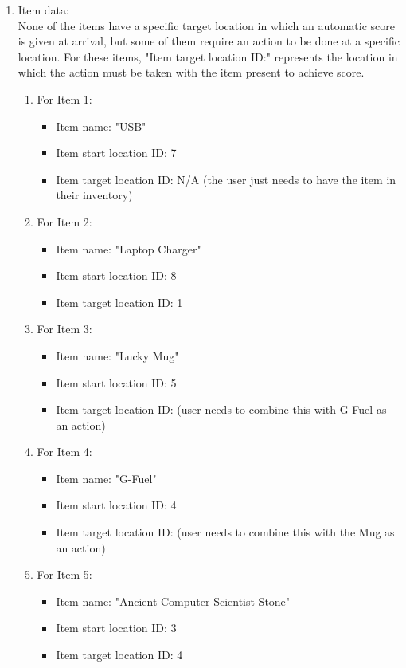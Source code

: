 \documentclass[11pt]{article}
\begin{document}
\begin{enumerate}
\item Item data:\\
None of the items have a specific target location in which an automatic score is given at arrival, but some of them require an action to be done at a specific location. For these items, "Item target location ID:" represents the location in which the action must be taken with the item present to achieve score.
\begin{enumerate}
    \item For Item 1:
    \begin{itemize}
    \item Item name: "USB"
    \item Item start location ID: 7
    \item Item target location ID: N/A (the user just needs to have the item in their inventory)
    \end{itemize}
        \item For Item 2:
    \begin{itemize}
    \item Item name: "Laptop Charger"
    \item Item start location ID: 8
    \item Item target location ID: 1
    \end{itemize}
        \item For Item 3:
    \begin{itemize}
    \item Item name: "Lucky Mug"
    \item Item start location ID: 5
    \item Item target location ID: (user needs to combine this with G-Fuel as an action)
    \end{itemize}
    \item For Item 4:
    \begin{itemize}
    \item Item name: "G-Fuel"
    \item Item start location ID: 4
    \item Item target location ID: (user needs to combine this with the Mug as an action)
    \end{itemize}
    \item For Item 5:
    \begin{itemize}
    \item Item name: "Ancient Computer Scientist Stone"
    \item Item start location ID: 3
    \item Item target location ID: 4
    \end{itemize}
\end{enumerate}


\end{enumerate}
\end{document}

